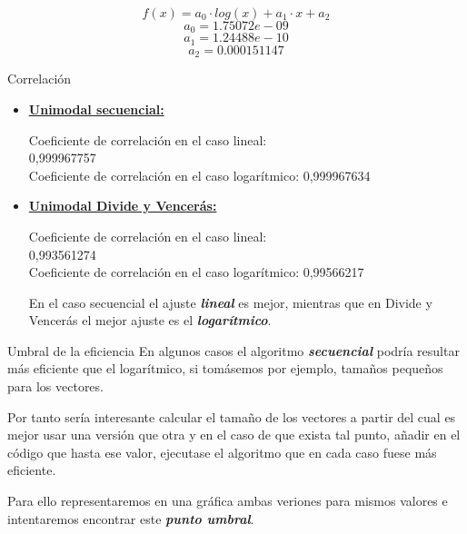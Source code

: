 \documentclass[12pt]{beamer}
\begin{document}
\begin{frame}
\[
f(x)=a_0 \cdot log(x)+a_1 \cdot x+a_2
\]
\[
a_0=1.75072e-09
\]
\[
a_1=1.24488e-10
\]
\[
a_2=0.000151147 
\]
\end{frame}

\begin{frame}{Correlación}
\justify
\begin{itemize}
\item \underline{\textbf{Unimodal secuencial:}}
\vspace{3mm} %

	Coeficiente de correlación en el caso lineal: \\
	0,999967757\\
	Coeficiente de correlación en el caso logarítmico: 
	0,999967634
	
\vspace{2mm} %

\item \underline{\textbf{Unimodal Divide y Vencerás:}}
\vspace{3mm} %

	Coeficiente de correlación en el caso lineal: \\
	0,993561274\\
	Coeficiente de correlación en el caso logarítmico: 
	0,99566217
	
\vspace{5mm} %
\justify
En el caso secuencial el ajuste \textbf{\textit{lineal}} es mejor, mientras que en Divide y Vencerás el mejor ajuste es el \textbf{\textit{logarítmico}}. 
\end{itemize}
\end{frame}

\begin{frame}{Umbral de la eficiencia}
\justify
En algunos casos el algoritmo \textbf{\textit{secuencial}} podría resultar más eficiente que el logarítmico, si tomásemos por ejemplo, tamaños pequeños para los vectores.

\vspace{5mm} %
\justify
Por tanto sería interesante calcular el tamaño de los vectores a partir del cual es mejor usar una versión que otra y en el caso de que exista tal punto, añadir en el código que hasta ese valor, ejecutase el algoritmo que en cada caso fuese más eficiente.

\vspace{5mm} %
\justify
Para ello representaremos en una gráfica ambas veriones para mismos valores e intentaremos encontrar este \textbf{\textit{punto umbral}}.
 
\end{frame}
\end{document}
